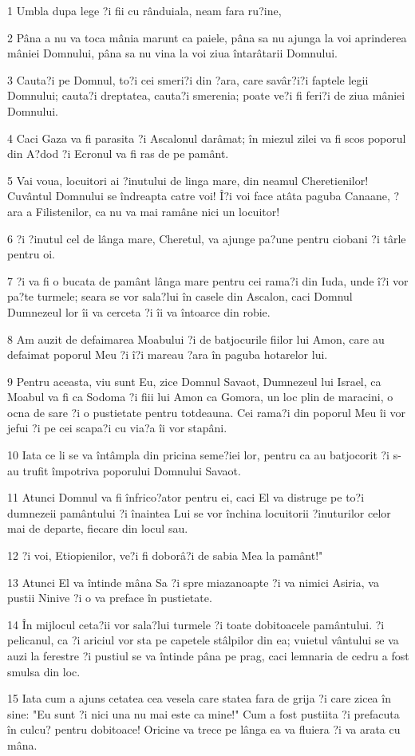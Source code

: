 \par 1 Umbla dupa lege ?i fii cu rânduiala, neam fara ru?ine,
\par 2 Pâna a nu va toca mânia marunt ca paiele, pâna sa nu ajunga la voi aprinderea mâniei Domnului, pâna sa nu vina la voi ziua întarâtarii Domnului.
\par 3 Cauta?i pe Domnul, to?i cei smeri?i din ?ara, care savâr?i?i faptele legii Domnului; cauta?i dreptatea, cauta?i smerenia; poate ve?i fi feri?i de ziua mâniei Domnului.
\par 4 Caci Gaza va fi parasita ?i Ascalonul darâmat; în miezul zilei va fi scos poporul din A?dod ?i Ecronul va fi ras de pe pamânt.
\par 5 Vai voua, locuitori ai ?inutului de linga mare, din neamul Cheretienilor! Cuvântul Domnului se îndreapta catre voi! Î?i voi face atâta paguba Canaane, ?ara a Filistenilor, ca nu va mai ramâne nici un locuitor!
\par 6 ?i ?inutul cel de lânga mare, Cheretul, va ajunge pa?une pentru ciobani ?i târle pentru oi.
\par 7 ?i va fi o bucata de pamânt lânga mare pentru cei rama?i din Iuda, unde î?i vor pa?te turmele; seara se vor sala?lui în casele din Ascalon, caci Domnul Dumnezeul lor îi va cerceta ?i îi va întoarce din robie.
\par 8 Am auzit de defaimarea Moabului ?i de batjocurile fiilor lui Amon, care au defaimat poporul Meu ?i î?i mareau ?ara în paguba hotarelor lui.
\par 9 Pentru aceasta, viu sunt Eu, zice Domnul Savaot, Dumnezeul lui Israel, ca Moabul va fi ca Sodoma ?i fiii lui Amon ca Gomora, un loc plin de maracini, o ocna de sare ?i o pustietate pentru totdeauna. Cei rama?i din poporul Meu îi vor jefui ?i pe cei scapa?i cu via?a îi vor stapâni.
\par 10 Iata ce li se va întâmpla din pricina seme?iei lor, pentru ca au batjocorit ?i s-au trufit împotriva poporului Domnului Savaot.
\par 11 Atunci Domnul va fi înfrico?ator pentru ei, caci El va distruge pe to?i dumnezeii pamântului ?i înaintea Lui se vor închina locuitorii ?inuturilor celor mai de departe, fiecare din locul sau.
\par 12 ?i voi, Etiopienilor, ve?i fi doborâ?i de sabia Mea la pamânt!"
\par 13 Atunci El va întinde mâna Sa ?i spre miazanoapte ?i va nimici Asiria, va pustii Ninive ?i o va preface în pustietate.
\par 14 În mijlocul ceta?ii vor sala?lui turmele ?i toate dobitoacele pamântului. ?i pelicanul, ca ?i ariciul vor sta pe capetele stâlpilor din ea; vuietul vântului se va auzi la ferestre ?i pustiul se va întinde pâna pe prag, caci lemnaria de cedru a fost smulsa din loc.
\par 15 Iata cum a ajuns cetatea cea vesela care statea fara de grija ?i care zicea în sine: "Eu sunt ?i nici una nu mai este ca mine!" Cum a fost pustiita ?i prefacuta în culcu? pentru dobitoace! Oricine va trece pe lânga ea va fluiera ?i va arata cu mâna.

